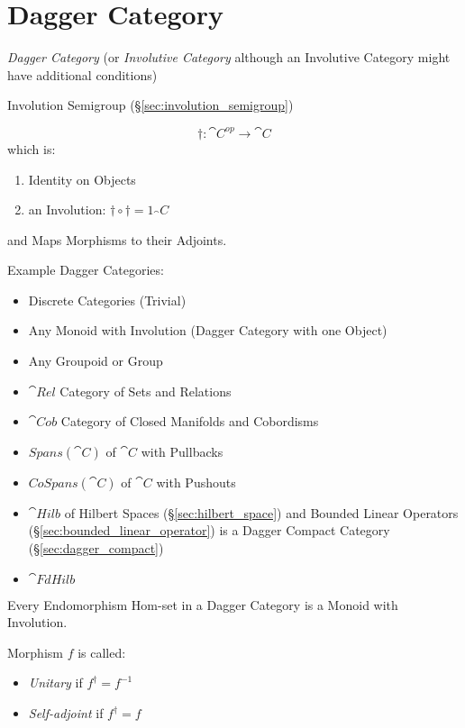 \section{Dagger Category}\label{sec:dagger_category}

\emph{Dagger Category} (or \emph{Involutive Category} although an
Involutive Category might have additional conditions) %

Involution Semigroup (\S\ref{sec:involution_semigroup})

\[
  \dag : \cat{C}^{op} \rightarrow \cat{C}
\]
which is:
\begin{enumerate}
  \item Identity on Objects
  \item an Involution: $\dag \circ \dag = 1_\cat{C}$
\end{enumerate}
and Maps Morphisms to their Adjoints. %

Example Dagger Categories:
\begin{itemize}
  \item Discrete Categories (Trivial)
  \item Any Monoid with Involution (Dagger Category with one Object)
  \item Any Groupoid or Group
  \item $\cat{Rel}$ Category of Sets and Relations
  \item $\cat{Cob}$ Category of Closed Manifolds and Cobordisms
  \item $Spans(\cat{C})$ of $\cat{C}$ with Pullbacks
  \item $CoSpans(\cat{C})$ of $\cat{C}$ with Pushouts
  \item $\cat{Hilb}$ of Hilbert Spaces (\S\ref{sec:hilbert_space}) and
    Bounded Linear Operators (\S\ref{sec:bounded_linear_operator}) is
    a Dagger Compact Category (\S\ref{sec:dagger_compact})
  \item $\cat{FdHilb}$
\end{itemize}

Every Endomorphism Hom-set in a Dagger Category is a Monoid with
Involution.

Morphism $f$ is called:
\begin{itemize}
  \item \emph{Unitary} if $f^\dag = f^{-1}$
  \item \emph{Self-adjoint} if $f^\dag = f$
\end{itemize}

